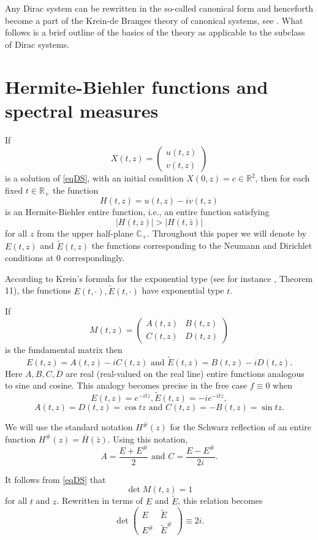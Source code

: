 \documentclass[11pt,twoside,reqno]{amsart}
\def\ti{\tilde}
\def\R{{\mathbb R}}
\def\C{{\mathbb{C}}}
\theoremstyle{plain}
\numberwithin{equation}{section}
\begin{document}
Any Dirac system can be rewritten in the so-called canonical form and henceforth become a part of the Krein-de Branges theory of
canonical systems, see \cite{dBr, DM, R, Ro}. What follows is a brief outline of the basics of the theory as applicable to the subclass of Dirac systems.

\section{Hermite-Biehler functions and spectral measures}\label{secHB}



If $$X(t,z)=\begin{pmatrix} u(t,z) \\ v(t,z) \end{pmatrix}$$ is a solution of \eqref{eqDS}, with an initial condition $X(0,z)=c\in \R^2$, then
for each fixed $t\in \R_+$
the function $$H(t,z)=u(t,z)-iv(t,z)$$ is an Hermite-Biehler entire function, i.e., an entire function satisfying
$$|H(t,z)|>|H(t,\bar z)|$$
for all $z$ from the upper half-plane $\C_+$. Throughout this paper we will denote by $E(t,z)$ and $\ti E(t,z)$ the functions
corresponding to the Neumann and Dirichlet conditions at $0$ correspondingly.

According to Krein's formula for the exponential type (see for instance \cite{R}, Theorem 11), the functions $E(t,\cdot), \ti E(t,\cdot)$ have
exponential type $t$.

If $$M(t,z)=\begin{pmatrix} A(t,z) & B(t,z) \\ C(t,z) & D(t,z) \end{pmatrix}$$ is the fundamental matrix then
$$E(t,z)=A(t,z)-iC(t,z)\textrm{ and }\ti E(t,z)=B(t,z)-iD(t,z).$$
Here $A,B,C,D$ are real (real-valued on the real line) entire functions
analogous to sine and cosine. This analogy becomes precise in the free case $f\equiv 0$ when $$E(t,z)=e^{-itz}, \ti E(t,z)=-ie^{-itz},$$
$$A(t,z)=D(t,z)=\cos tz\textrm{ and }C(t,z)=-B(t,z)=\sin tz.$$




We will use the standard notation $H^\#(z)$ for the Schwarz reflection of an entire function $H^\#(z)=\bar H(\bar z)$. Using this notation,
$$A=\frac{E+E^\#}2\textrm{ and } C=\frac{E-E^\#}{2i}.$$


It follows from \eqref{eqDS} that
\begin{equation}\det M(t,z)= 1\label{det=1}\end{equation}
for all $t$ and $z$.
Rewritten in terms of $E$ and $\ti E$, this relation becomes
\begin{equation}\det\begin{pmatrix} E &  \ti E \\ E^\# & \ti E^\#
\end{pmatrix}\equiv 2i.\label{eqDet2i}\end{equation}
\end{document}
